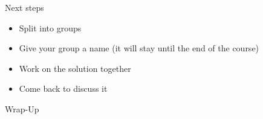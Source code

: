 \documentclass[aspectratio=169,10pt]{beamer}
\begin{document}
%

\begin{frame}{Next steps}
	\begin{itemize}
		\item Split into groups
		\item Give your group a name (it will stay until the end of the course)
		\item Work on the solution together
		\item Come back to discuss it
	\end{itemize}	
\end{frame}	


	
\begin{frame}[t,standout]
	\Large
	Wrap-Up
\end{frame}
\end{document}
